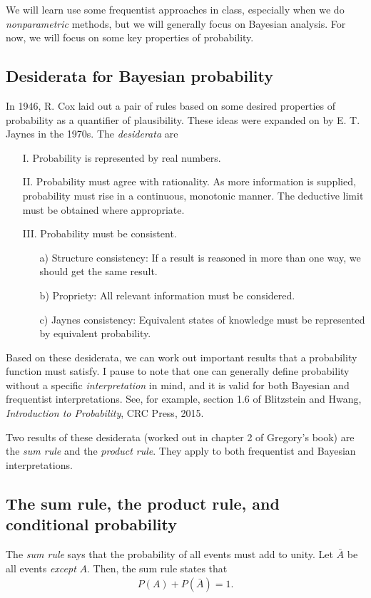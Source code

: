 We will learn use some frequentist approaches in class, especially when we do \textit{nonparametric} methods, but we will
generally focus on Bayesian analysis. For now, we will focus on some key properties of probability.

\subsection{Desiderata for Bayesian probability}
In 1946, R. Cox laid out a pair of rules based on some desired
properties of probability as a quantifier of plausibility.  These ideas
were expanded on by E. T. Jaynes in the 1970s.  The
\textit{desiderata} are
\begin{itemize}
\item[I.] Probability is represented by real numbers.
\item[II.] Probability must agree with rationality.  As more
  information is supplied, probability must rise in a continuous,
  monotonic manner.  The deductive limit must be obtained where
  appropriate.
\item[III.] Probability must be consistent.
  \begin{enumerate}
  \item[a)] Structure consistency: If a result is reasoned in more
    than one way, we should get the same result.
  \item[b)] Propriety: All relevant information must be considered.
  \item[c)] Jaynes consistency: Equivalent states of knowledge must be
    represented by equivalent probability.
  \end{enumerate}
\end{itemize}

Based on these desiderata, we can work out important results that a probability function must satisfy. I pause to note that one can generally define probability without a specific \textit{interpretation} in mind, and it is valid for both Bayesian and frequentist interpretations. See, for example, section 1.6 of Blitzstein and Hwang, \textit{Introduction to Probability}, CRC Press, 2015.

Two results of these desiderata (worked out in chapter 2 of Gregory's
book) are the \textit{sum rule} and the \textit{product rule}. They apply to both frequentist and Bayesian interpretations.

\subsection{The sum rule, the product rule, and conditional probability}
The \textit{sum rule} says that the probability of all events must add
to unity.  Let $\bar{A}$ be all events \textit{except} $A$.  Then, the
sum rule states that
\begin{align}
  P(A) + P(\bar{A}) = 1.
\end{align}

